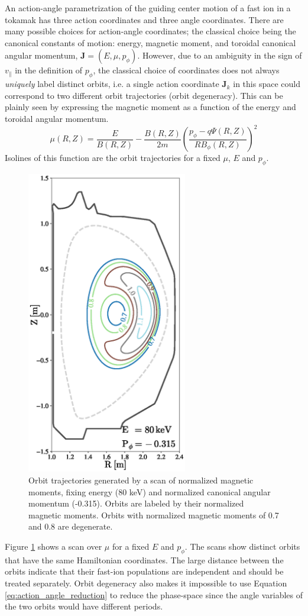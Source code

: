 An action-angle parametrization of the guiding center motion of a fast ion in a tokamak has three action coordinates and three angle coordinates.
There are many possible choices for action-angle coordinates; the classical choice being the canonical constants of motion: energy, magnetic moment, and toroidal canonical angular momentum, $\mathbf{J} = (E,\mu,p_\phi)$.
However, due to an ambiguity in the sign of $v_\parallel$ in the definition of $p_\phi$, the classical choice of coordinates does not always \textit{uniquely} label distinct orbits, i.e. a single action coordinate $ \mathbf{J}_k$ in this space could correspond to two different orbit trajectories (orbit degeneracy). This can be plainly seen by expressing the magnetic moment as a function of the energy and toroidal angular momentum. 
\begin{equation}\label{eq:mu}
\mu(R,Z) = \frac{E}{B(R,Z)} - \frac{B(R,Z)}{2m} \left ( \frac{p_\phi - q\Psi(R,Z)}{RB_\phi(R,Z)}\right)^2
\end{equation}
Isolines of this function are the orbit trajectories for a fixed $\mu$, $E$ and $p_\phi$.
\begin{figure}[h!]
    \centering
    \includegraphics[width=7cm]{figures/hamiltonian_orbits.eps}
    \caption{Orbit trajectories generated by a scan of normalized magnetic moments, fixing energy (80 keV) and normalized canonical angular momentum (-0.315). Orbits are labeled by their normalized magnetic moments. Orbits with normalized magnetic moments of 0.7 and 0.8 are degenerate.}
    \label{fig:hamiltonian_orbits}
\end{figure}
Figure \ref{fig:hamiltonian_orbits} shows a scan over $\mu$ for a fixed $E$ and $p_\phi$. The scans show distinct orbits that have the same Hamiltonian coordinates.
The large distance between the orbits indicate that their fast-ion populations are independent and should be treated separately.
Orbit degeneracy also makes it impossible to use Equation \ref{eq:action_angle_reduction} to reduce the phase-space since the angle variables of the two orbits would have different periods.

